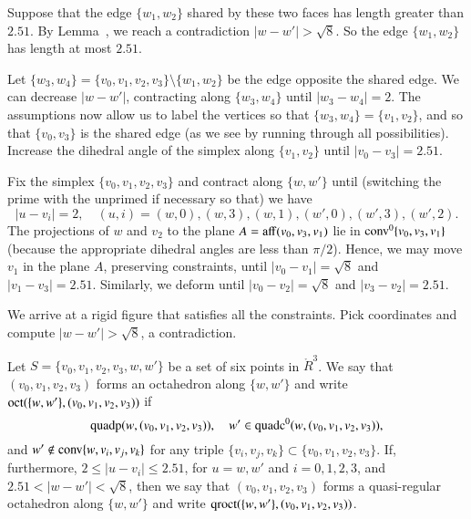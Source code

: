 \begin{tarskidata}
\begin{tarski}
\begin{proved}
Suppose that the edge $\{w_1,w_2\}$
shared by these two faces has length greater
than $2.51$.  By Lemma~, 
we reach a contradiction $|w-w'|>\sqrt8$.
So the edge $\{w_1,w_2\}$ has length at most $2.51$.

Let $\{w_3,w_4\} = \{v_0,v_1,v_2,v_3\}\setminus \{w_1,w_2\}$ be the
edge opposite the shared edge.  We can decrease $|w-w'|$, contracting
along $\{w_3,w_4\}$ until $|w_3-w_4|=2$.  The assumptions now allow
us to label the vertices so that $\{w_3,w_4\}=\{v_1,v_2\}$, and so
that
$\{v_0,v_3\}$ is the shared edge (as we see by running through
all possibilities).  Increase the dihedral angle
of the simplex along $\{v_1,v_2\}$ until $|v_0-v_3|=2.51$.

Fix the simplex $\{v_0,v_1,v_2,v_3\}$ and contract along $\{w,w'\}$
until (switching the prime with the unprimed if necessary so that) we have
  $$
  |u-v_i| = 2,\quad (u,i)=(w,0),(w,3),(w,1), (w',0), (w',3),(w',2).
  $$
The projections of $w$ and $v_2$ to the plane $A={\operatorname{aff}}(v_0,v_3,v_1)$
lie in ${\operatorname{conv}}^0\{v_0,v_3,v_1\}$ (because the appropriate dihedral
angles are less than $\pi/2$).  Hence, we may move
$v_1$ in the plane $A$, preserving constraints,
until $|v_0-v_1|=\sqrt8$ and $|v_1-v_3|=2.51$.
Similarly, we deform until $|v_0-v_2|=\sqrt8$ and $|v_3-v_2|=2.51$.

We arrive at a rigid figure that satisfies all the constraints.
Pick coordinates and compute $|w-w'| > \sqrt8$, a contradiction.
\swallowed\end{proved}
\end{tarski}







\begin{tarski}

\begin{definition}[octahedron]
Let $S=\{v_0,v_1,v_2,v_3,w,w'\}$ be a set of six points in $\ring{R}^3$.
We say that $(v_0,v_1,v_2,v_3)$ forms an octahedron along $\{w,w'\}$ and write
${\operatorname{oct}}(\{w,w'\},(v_0,v_1,v_2,v_3))$ if
$$
  {\operatorname{quadp}}(w,(v_0,v_1,v_2,v_3)),\quad
   w'\in{\operatorname{quadc}}^0(w,(v_0,v_1,v_2,v_3)),
$$
and $w'\not\in{\operatorname{conv}}\{w,v_i,v_j,v_k\}$ for any triple
$\{v_i,v_j,v_k\}\subset \{v_0,v_1,v_2,v_3\}$.
If, furthermore, $2\le |u-v_i|\le 2.51$, for $u=w,w'$ and $i=0,1,2,3$,
and $2.51<|w-w'|<\sqrt8$, then we say that 
$(v_0,v_1,v_2,v_3)$ forms a quasi-regular octahedron along
 $\{w,w'\}$ and write
${\operatorname{qroct}}(\{w,w'\},(v_0,v_1,v_2,v_3))$.
\end{definition}
\end{tarski}




\end{tarskidata}
